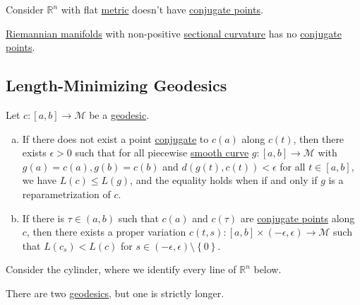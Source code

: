 \begin{eg}
	Consider \(\mathbb{R} ^n\) with flat \hyperref[def:Riemannian-metric]{metric} doesn't have \hyperref[def:conjugate-point]{conjugate points}.
\end{eg}

\begin{eg}
	\hyperref[def:Riemannian-manifold]{Riemannian manifolds} with non-positive \hyperref[def:sectional-curvature]{sectional curvature} has no \hyperref[def:conjugate-point]{conjugate points}.
\end{eg}

\subsection{Length-Minimizing Geodesics}

\begin{theorem}\label{thm:lec18-2}
	Let \(c\colon [a, b] \to \mathcal{M} \) be a \hyperref[def:geodesic]{geodesic}.
	\begin{enumerate}[(a)]
		\item If there does not exist a point \hyperref[def:conjugate-point]{conjugate} to \(c(a)\) along \(c(t)\), then there exists \(\epsilon > 0\) such that for all piecewise \hyperref[def:curve]{smooth curve} \(g\colon [a, b] \to \mathcal{M} \) with \(g(a) = c(a), g(b) = c(b)\) and \(d(g(t), c(t)) < \epsilon \) for all \(t\in [a, b]\), we have \(L(c) \leq L(g)\), and the equality holds when if and only if \(g\) is a reparametrization of \(c\).
		\item If there is \(\tau \in (a, b)\) such that \(c(a)\) and \(c(\tau )\) are \hyperref[def:conjugate-point]{conjugate points} along \(c\), then there exists a proper variation \(c(t, s) \colon [a, b] \times (-\epsilon , \epsilon ) \to \mathcal{M} \) such that \(L(c_s) < L(c)\) for \(s \in (-\epsilon , \epsilon ) \setminus \left\{ 0 \right\} \).
	\end{enumerate}
\end{theorem}

\begin{remark}
	Consider the cylinder, where we identify every line of \(\mathbb{R} ^n\) below.
	\begin{center}
	\end{center}
	There are two \hyperref[def:geodesic]{geodesics}, but one is strictly longer.
\end{remark}

